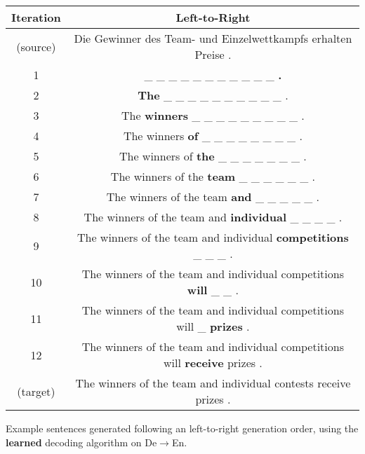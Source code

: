 \centering
\footnotesize
\begin{tabular}{cc}
\toprule
Iteration & {\color{green} Left-to-Right} \\
\midrule
(source) & Die Gewinner des Team- und Einzelwettkampfs erhalten Preise .\\
1 & \_ \_ \_ \_ \_ \_ \_ \_ \_ \_ \_ \textbf{.} \\
2 & \textbf{The} \_ \_ \_ \_ \_ \_ \_ \_ \_ \_ . \\
3 & The \textbf{winners} \_ \_ \_ \_ \_ \_ \_ \_ \_ . \\
4 & The winners \textbf{of} \_ \_ \_ \_ \_ \_ \_ \_ . \\
5 & The winners of \textbf{the} \_ \_ \_ \_ \_ \_ \_ . \\
6 & The winners of the \textbf{team} \_ \_ \_ \_ \_ \_ . \\
7 & The winners of the team \textbf{and} \_ \_ \_ \_ \_ . \\
8 & The winners of the team and \textbf{individual} \_ \_ \_ \_ . \\
9 & The winners of the team and individual \textbf{competitions} \_ \_ \_ . \\
10 & The winners of the team and individual competitions \textbf{will} \_ \_ . \\
11 & The winners of the team and individual competitions will \_ \textbf{prizes} . \\
12 & The winners of the team and individual competitions will \textbf{receive} prizes . \\
(target) & The winners of the team and individual contests receive prizes . \\

\bottomrule
\end{tabular}

\caption{Example sentences generated following an {\color{green} left-to-right} generation order, using the \textbf{learned} decoding algorithm on De$\rightarrow$En.}